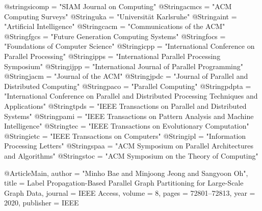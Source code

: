 @string{sicomp = "SIAM Journal on Computing"}
@String{acmcs  = "{ACM} Computing Surveys"}
@String{uka    = "Universit{\"a}t Karlsruhe"}
@String{aint   = "Artificial Intelligence"}
@String{cacm   = "Communications of the ACM"}
@String{fgcs   = "Future Generation Computing Systems"}
@String{focs   = "Foundations of Computer Science"}
@String{icpp   = "International Conference on Parallel Processing"}
@String{ipps   = "International Parallel Processing Symposium"}
@String{ijpp   = "International Journal of Parallel Programming"}
@String{jacm   = "Journal of the ACM"}
@String{jpdc   = "Journal of Parallel and Distributed Computing"}
@String{paco   = "Parallel Computing"}
@String{pdpta  = "International Conference on Parallel and Distributed Processing Techniques and Applications"}
@String{tpds   = "IEEE Transactions on Parallel and Distributed Systems"}
@String{pami   = "IEEE Transactions on Pattern Analysis and Machine Intelligence"}
@String{tec     = "IEEE Transactions on Evolutionary Computation"}
@String{ietc   = "IEEE Transactions on Computers"}
@String{ipl    = "Information Processing Letters"}
@String{spaa   = "ACM Symposium on Parallel Architectures and Algorithms"}
@String{stoc   = "ACM Symposium on the Theory of Computing"}

@Article{Main,
        author    = "Minho Bae and Minjoong Jeong and Sangyoon Oh",
        title     = {{Label Propagation-Based Parallel Graph Partitioning for Large-Scale Graph Data}},
        journal   = {IEEE Access},
        volume    = {8},
        pages     = {72801--72813},
        year      = {2020},
        publisher = {IEEE}
}
